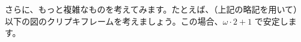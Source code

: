 \documentclass[
		head_space=20mm,
		foot_space=20mm,
		gutter=10mm,
		line_length=190mm
]{jlreq}
\begin{document}
さらに、もっと複雑なものを考えてみます。たとえば、（上記の略記を用いて）以下の図のクリプキフレームを考えましょう。この場合、$\omega\cdot 2+1$ で安定します。
\vspace{10pt}
\end{document}
